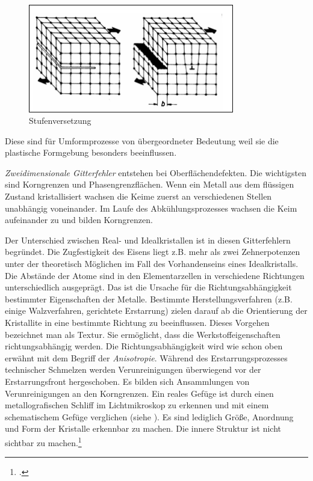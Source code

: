 \documentclass[12pt,a4paper,parskip]{scrartcl}
\begin{document}
{\begin{enumerate*}
\begin{figure}
\centering
\includegraphics[width=0.8\textwidth]{versetzung}
\caption[Stufenversetzung]{Stufenversetzung\protect\footnotemark}
\label{fig:versetzung}
\end{figure}
 Diese sind für Umformprozesse von übergeordneter Bedeutung weil sie die plastische Formgebung besonders beeinflussen.
\item \emph{Zweidimensionale Gitterfehler} entstehen bei Oberflächendefekten. Die wichtigsten sind Korngrenzen und Phasengrenzflächen. Wenn ein Metall aus dem flüssigen Zustand kristallisiert wachsen die Keime zuerst an verschiedenen Stellen unabhängig voneinander. Im Laufe des Abkühlungsprozesses wachsen die Keim aufeinander zu und bilden Korngrenzen.
\end{enumerate*}

Der Unterschied zwischen Real- und Idealkristallen ist in diesen Gitterfehlern begründet. Die Zugfestigkeit des Eisens liegt  z.B. mehr als zwei Zehnerpotenzen unter der theoretisch Möglichen im Fall des Vorhandenseins eines Idealkristalls. Die Abstände der Atome sind in den Elementarzellen in verschiedene Richtungen unterschiedlich ausgeprägt. Das ist die Ursache für die Richtungsabhängigkeit bestimmter Eigenschaften der Metalle. Bestimmte Herstellungsverfahren (z.B. einige Walzverfahren, gerichtete Erstarrung) zielen darauf ab die Orientierung der Kristallite in eine bestimmte Richtung zu beeinflussen. Dieses Vorgehen bezeichnet man als Textur. Sie ermöglicht, dass die Werkstoffeigenschaften richtungsabhängig werden.  Die Richtungsabhängigkeit wird wie schon oben erwähnt mit dem Begriff der \emph{Anisotropie}. 
Während des Erstarrungsprozesses technischer Schmelzen werden Verunreinigungen überwiegend vor der Erstarrungsfront hergeschoben. Es bilden sich Ansammlungen von Verunreinigungen an den Korngrenzen. Ein reales Gefüge ist durch einen metallografischen Schliff im Lichtmikroskop zu erkennen und mit einem schematischem Gefüge verglichen (siehe ). Es sind lediglich Größe, Anordnung und Form der Kristalle erkennbar zu machen. Die innere Struktur ist nicht sichtbar zu machen.\footcite[Vgl.][3-6]{fu}

}
\end{document}
